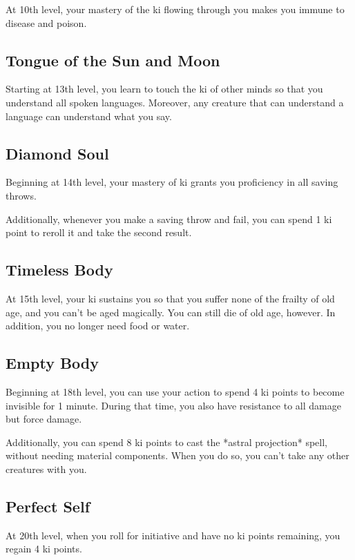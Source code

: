 At 10th level, your mastery of the ki flowing through you makes you immune to disease and poison.

\subsection{Tongue of the Sun and Moon}

Starting at 13th level, you learn to touch the ki of other minds so that you understand all spoken languages. Moreover, any creature that can understand a language can understand what you say.

\subsection{Diamond Soul}

Beginning at 14th level, your mastery of ki grants you proficiency in all saving throws.

Additionally, whenever you make a saving throw and fail, you can spend 1 ki point to reroll it and take the second result.

\subsection{Timeless Body}

At 15th level, your ki sustains you so that you suffer none of the frailty of old age, and you can’t be aged magically. You can still die of old age, however. In addition, you no longer need food or water.

\subsection{Empty Body}

Beginning at 18th level, you can use your action to spend 4 ki points to become invisible for 1 minute. During that time, you also have resistance to all damage but force damage.

Additionally, you can spend 8 ki points to cast the *astral projection* spell, without needing material components. When you do so, you can’t take any other creatures with you.

\subsection{Perfect Self}

At 20th level, when you roll for initiative and have no ki points remaining, you regain 4 ki points.

